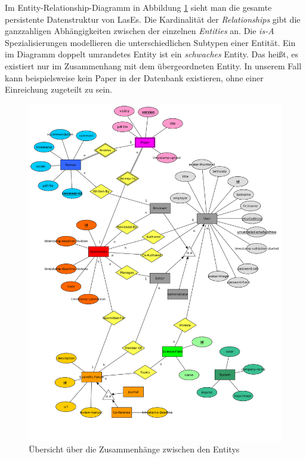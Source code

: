 
Im Entity-Relationship-Diagramm in Abbildung \ref{er:diagramm} sieht man die gesamte persistente Datenstruktur von LasEs. Die Kardinalität der \emph{Relationships} gibt die ganzzahligen Abhängigkeiten zwischen der einzelnen \emph{Entities} an. Die \emph{is-A} Spezialisierungen modellieren die unterschiedlichen Subtypen einer Entität. Ein im Diagramm doppelt umrandetes Entity ist ein \emph{schwaches} Entity. Das heißt, es existiert nur im Zusammenhang mit dem übergeordneten Entity. In unserem Fall kann beispielsweise kein Paper in der Datenbank existieren, ohne einer Einreichung zugeteilt zu sein.

\begin{figure}[H]
	\centering
	\includegraphics[width=\linewidth]{graphics/ER-Modell}
	\caption{Übersicht über die Zusammenhänge zwischen den Entitys}
	\label{er:diagramm}
\end{figure}

